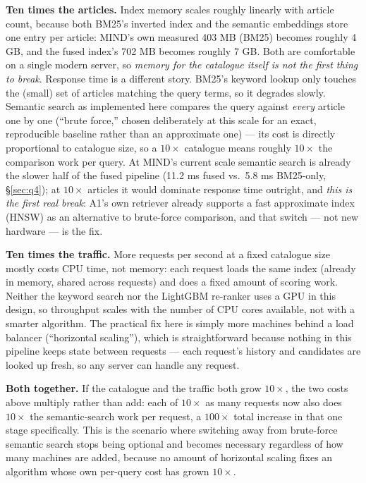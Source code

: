 \documentclass[11pt,a4paper]{article}
\begin{document}
\textbf{Ten times the articles.} Index memory scales roughly linearly with article count, because
both BM25's inverted index and the semantic embeddings store one entry per article: MIND's own
measured 403 MB (BM25) becomes roughly 4 GB, and the fused index's 702 MB becomes roughly 7 GB.
Both are comfortable on a single modern server, so \emph{memory for the catalogue itself is not
the first thing to break}. Response time is a different story. BM25's keyword lookup only touches
the (small) set of articles matching the query terms, so it degrades slowly. Semantic search as
implemented here compares the query against \emph{every} article one by one (``brute force,''
chosen deliberately at this scale for an exact, reproducible baseline rather than an approximate
one) --- its cost is directly proportional to catalogue size, so a $10\times$ catalogue means
roughly $10\times$ the comparison work per query. At MIND's current scale semantic search is
already the slower half of the fused pipeline (11.2 ms fused vs.\ 5.8 ms BM25-only, \S\ref{sec:q4});
at $10\times$ articles it would dominate response time outright, and \emph{this is the first real
break}: A1's own retriever already supports a fast approximate index (HNSW) as an alternative to
brute-force comparison, and that switch --- not new hardware --- is the fix.

\textbf{Ten times the traffic.} More requests per second at a fixed catalogue size mostly costs
CPU time, not memory: each request loads the same index (already in memory, shared across
requests) and does a fixed amount of scoring work. Neither the keyword search nor the LightGBM
re-ranker uses a GPU in this design, so throughput scales with the number of CPU cores available,
not with a smarter algorithm. The practical fix here is simply more machines behind a load
balancer (``horizontal scaling''), which is straightforward because nothing in this pipeline keeps
state between requests --- each request's history and candidates are looked up fresh, so any
server can handle any request.

\textbf{Both together.} If the catalogue and the traffic both grow $10\times$, the two costs above
multiply rather than add: each of $10\times$ as many requests now also does $10\times$ the
semantic-search work per request, a $100\times$ total increase in that one stage specifically.
This is the scenario where switching away from brute-force semantic search stops being optional
and becomes necessary regardless of how many machines are added, because no amount of horizontal
scaling fixes an algorithm whose own per-query cost has grown $10\times$.
\end{document}
